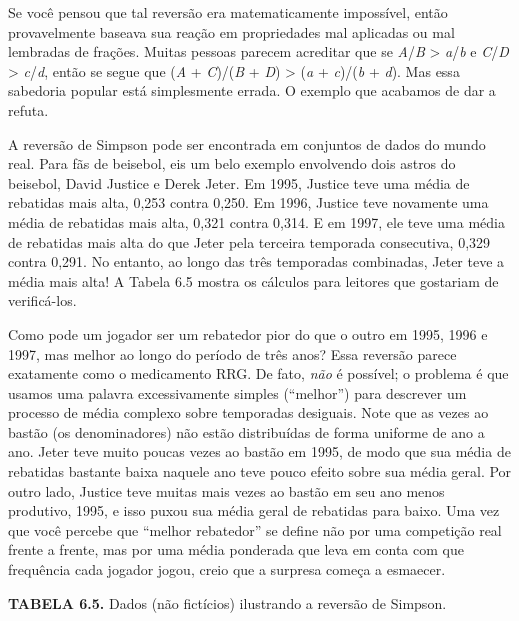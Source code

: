\documentclass[11pt,a5paper,twoside]{book}
\begin{document}
Se você pensou que tal reversão era matematicamente impossível, então provavelmente baseava sua reação em propriedades mal aplicadas ou mal lembradas de frações. Muitas pessoas parecem acreditar que se \textit{A}/\textit{B} > \textit{a}/\textit{b} e \textit{C}/\textit{D} > \textit{c}/\textit{d}, então se segue que (\textit{A} + \textit{C})/(\textit{B} + \textit{D}) > (\textit{a} + \textit{c})/(\textit{b} + \textit{d}). Mas essa sabedoria popular está simplesmente errada. O exemplo que acabamos de dar a refuta.

A reversão de Simpson pode ser encontrada em conjuntos de dados do mundo real. Para fãs de beisebol, eis um belo exemplo envolvendo dois astros do beisebol, David Justice e Derek Jeter. Em 1995, Justice teve uma média de rebatidas mais alta, 0,253 contra 0,250. Em 1996, Justice teve novamente uma média de rebatidas mais alta, 0,321 contra 0,314. E em 1997, ele teve uma média de rebatidas mais alta do que Jeter pela terceira temporada consecutiva, 0,329 contra 0,291. No entanto, ao longo das três temporadas combinadas, Jeter teve a média mais alta! A Tabela 6.5 mostra os cálculos para leitores que gostariam de verificá-los.

Como pode um jogador ser um rebatedor pior do que o outro em 1995, 1996 e 1997, mas melhor ao longo do período de três anos? Essa reversão parece exatamente como o medicamento RRG. De fato, \textit{não} é possível; o problema é que usamos uma palavra excessivamente simples (“melhor”) para descrever um processo de média complexo sobre temporadas desiguais. Note que as vezes ao bastão (os denominadores) não estão distribuídas de forma uniforme de ano a ano. Jeter teve muito poucas vezes ao bastão em 1995, de modo que sua média de rebatidas bastante baixa naquele ano teve pouco efeito sobre sua média geral. Por outro lado, Justice teve muitas mais vezes ao bastão em seu ano menos produtivo, 1995, e isso puxou sua média geral de rebatidas para baixo. Uma vez que você percebe que “melhor rebatedor” se define não por uma competição real frente a frente, mas por uma média ponderada que leva em conta com que frequência cada jogador jogou, creio que a surpresa começa a esmaecer.

\textbf{TABELA 6.5.} Dados (não fictícios) ilustrando a reversão de Simpson.
\end{document}
